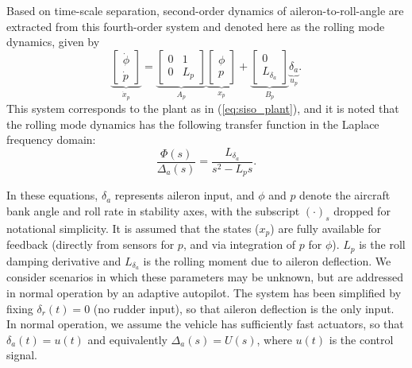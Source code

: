 Based on time-scale separation, second-order dynamics of aileron-to-roll-angle are extracted from this fourth-order system and denoted here as the rolling mode dynamics, given by
\begin{equation}
	\underbrace{\begin{bmatrix}
			\dot{\phi} \\ \dot{p}
		\end{bmatrix}}_{\dot{x}_p} = \underbrace{\begin{bmatrix}
			0 & 1 \\ 0 & L_p
		\end{bmatrix}}_{A_p} \underbrace{\begin{bmatrix}
			\phi \\ p
		\end{bmatrix}}_{x_p} + \underbrace{\begin{bmatrix}
			0 \\ L_{\delta_a}
		\end{bmatrix}}_{B_p} \underbrace{\delta_a}_{u_p}.
	\label{eqn:2nd_order_lateral}
\end{equation}
This system corresponds to the plant as in (\ref{eq:siso_plant}), and it is noted that the rolling mode dynamics has the following transfer function in the Laplace frequency domain:
\begin{equation}
		\frac{\Phi(s)}{\Delta_a(s)} = \frac{L_{\delta_a}}{s^2 - L_p s}.
\end{equation}

In these equations, $\delta_a$ represents aileron input, and $\phi$ and $p$ denote the aircraft bank angle and roll rate in stability axes, with the subscript $(\cdot)_s$ dropped for notational simplicity. It is assumed that the states ($x_p$) are fully available for feedback (directly from sensors for $p$, and via integration of $p$ for $\phi$). $L_p$ is the roll damping derivative and $L_{\delta_a}$ is the rolling moment due to aileron deflection. We consider scenarios in which these parameters may be unknown, but are addressed in normal operation by an adaptive autopilot. The system has been simplified by fixing $\delta_r(t) = 0$ (no rudder input), so that aileron deflection is the only input. In normal operation, we assume the vehicle has sufficiently fast actuators, so that $\delta_a(t) = u(t)$ and equivalently $\Delta_a(s) = U(s)$, where $u(t)$ is the control signal. 

